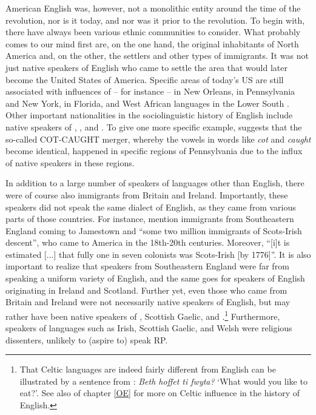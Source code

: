 \noindent American English was, however, not a monolithic entity around the time of the revolution, nor is it today, and nor was it prior to the revolution. To begin with, there have always been various ethnic communities to consider. What probably comes to our mind first are, on the one hand, the original inhabitants of North America and, on the other, the settlers and other types of immigrants. It was not just native speakers of English who came to settle the area that would later become the United States of America. Specific areas of today's US are still associated with influences of -- for instance --  in New Orleans,  in Pennsylvania and New York,  in Florida, and West African languages in the Lower South \citep[chapter 4]{WolframSchilling-Estes2015}. Other important nationalities in the sociolinguistic history of English include native speakers of , , and . To give one more specific example, \citet{Herold1997} suggests that the so-called COT-CAUGHT merger, whereby the vowels in words like \textit{cot} and \textit{caught} become identical, happened in specific regions of Pennsylvania due to the influx of native  speakers in these regions.

In addition to a large number of speakers of languages other than English, there were of course also immigrants from Britain and Ireland. Importantly, these speakers did not speak the same dialect of English, as they came from various parts of those countries. For instance, \citet[104]{WolframSchilling-Estes2015} mention immigrants from Southeastern England coming to Jamestown and ``some two million immigrants of Scots-Irish descent'', who came to America in the 18th-20th centuries. Moreover, ``{[}i{]}t is estimated {[}...{]} that fully one in seven colonists was Scots-Irish {[}by 1776{]}''. It is also important to realize that speakers from Southeastern England were far from speaking a uniform variety of English, and the same goes for speakers of English originating in Ireland and Scotland. Further yet, even those who came from Britain and Ireland were not necessarily native speakers of English, but may rather have been native speakers of , Scottish Gaelic, and .\footnote{That Celtic languages are indeed fairly different from English can be illustrated by a sentence from : \textit{Beth hoffet ti fwyta?} `What would you like to eat?'. See also  of chapter \ref{OE} for more on Celtic influence in the history of English.} Furthermore, speakers of languages such as Irish, Scottish Gaelic, and Welsh were religious dissenters, unlikely to (aspire to) speak RP.

